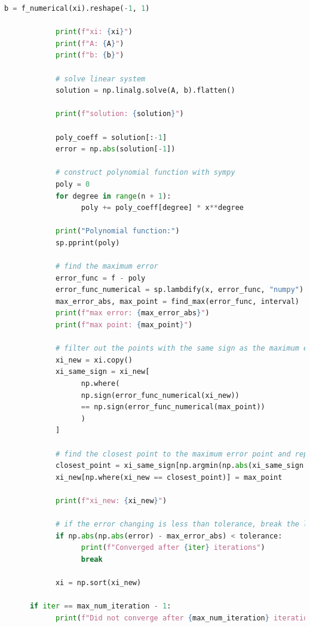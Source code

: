 \documentclass[conference,onecolumn]{IEEEtran}
\begin{document}
\begin{enumerate}[label=\arabic{enumi}.]
\begin{enumerate}
\begin{lstlisting}[language=Python]
            b = f_numerical(xi).reshape(-1, 1)

            print(f"xi: {xi}")
            print(f"A: {A}")
            print(f"b: {b}")

            # solve linear system
            solution = np.linalg.solve(A, b).flatten()

            print(f"solution: {solution}")

            poly_coeff = solution[:-1]
            error = np.abs(solution[-1])

            # construct polynomial function with sympy
            poly = 0
            for degree in range(n + 1):
                  poly += poly_coeff[degree] * x**degree

            print("Polynomial function:")
            sp.pprint(poly)

            # find the maximum error
            error_func = f - poly
            error_func_numerical = sp.lambdify(x, error_func, "numpy")
            max_error_abs, max_point = find_max(error_func, interval)
            print(f"max error: {max_error_abs}")
            print(f"max point: {max_point}")

            # filter out the points with the same sign as the maximum error
            xi_new = xi.copy()
            xi_same_sign = xi_new[
                  np.where(
                  np.sign(error_func_numerical(xi_new))
                  == np.sign(error_func_numerical(max_point))
                  )
            ]

            # find the closest point to the maximum error point and replace it with the maximum error point
            closest_point = xi_same_sign[np.argmin(np.abs(xi_same_sign - max_point))]
            xi_new[np.where(xi_new == closest_point)] = max_point

            print(f"xi_new: {xi_new}")

            # if the error changing is less than tolerance, break the loop
            if np.abs(np.abs(error) - max_error_abs) < tolerance:
                  print(f"Converged after {iter} iterations")
                  break

            xi = np.sort(xi_new)

      if iter == max_num_iteration - 1:
            print(f"Did not converge after {max_num_iteration} iterations")


\end{lstlisting}
\end{enumerate}
\end{enumerate}
\end{document}
